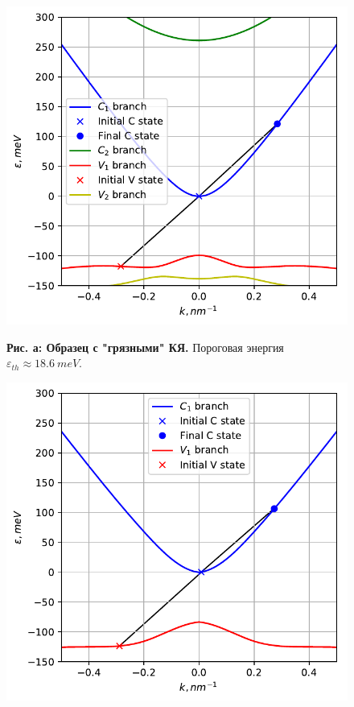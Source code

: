 \documentclass[../main.tex]{subfiles}
\begin{document}
        \begin{figure}[h!]
            \begin{minipage}[h]{0.49\linewidth}
                \begin{center}
                    \includegraphics[width=1.\linewidth]{./images/main_14u_80K_pic.pdf}

                    \textbf{Рис. а: Образец с "грязными" КЯ.} Пороговая энергия 
                        $\varepsilon_{th} \approx 18.6~meV$.
                \end{center}
            \end{minipage}
            \hfill
            \begin{minipage}[h]{0.49\linewidth}
                \begin{center}
                    \includegraphics[width=1.\linewidth]{./images/14u_pure_80K.pdf}


\end{center}
\end{minipage}
\end{figure}
\end{document}
